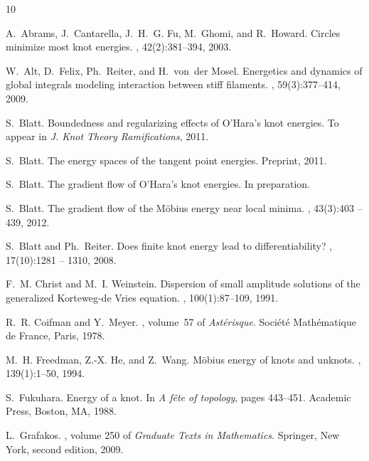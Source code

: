 \documentclass[a4paper,10pt]{article}
\theoremstyle{proof}
\theoremstyle{plain}
\numberwithin{equation}{section}
\begin{document}
\begin{thebibliography}{10}

A.~Abrams, J.~Cantarella, J.~H.~G. Fu, M.~Ghomi, and R.~Howard.
\newblock Circles minimize most knot energies.
, 42(2):381--394, 2003.

W.~Alt, D.~Felix, {\relax Ph}.~Reiter, and H.~von~der Mosel.
\newblock Energetics and dynamics of global integrals modeling interaction
  between stiff filaments.
, 59(3):377--414, 2009.

S.~Blatt.
\newblock Boundedness and regularizing effects of {O'Hara}'s knot energies.
\newblock To appear in {\em J. Knot Theory Ramifications},
  2011.

S.~Blatt.
\newblock The energy spaces of the tangent point energies.
\newblock Preprint, 2011.

S.~Blatt.
\newblock The gradient flow of {O'Hara}'s knot energies.
\newblock In preparation.

S.~Blatt.
\newblock The gradient flow of the {M}\"obius energy near local minima.
, 43(3):403 --439, 2012.

S.~Blatt and {\relax Ph}.~Reiter.
\newblock Does finite knot energy lead to differentiability?
, 17(10):1281 -- 1310, 2008.

F.~M. Christ and M.~I. Weinstein.
\newblock Dispersion of small amplitude solutions of the generalized
  {K}orteweg-de {V}ries equation.
, 100(1):87--109, 1991.

R.~R. Coifman and Y.~Meyer.
, volume~57 of
  {\em Ast\'erisque}.
\newblock Soci\'et\'e Math\'ematique de France, Paris, 1978.

M.~H. Freedman, Z.-X. He, and Z.~Wang.
\newblock M\"obius energy of knots and unknots.
, 139(1):1--50, 1994.

S.~Fukuhara.
\newblock Energy of a knot.
\newblock In {\em A f\^ete of topology}, pages 443--451. Academic Press,
  Boston, MA, 1988.

L.~Grafakos.
, volume 250 of {\em Graduate Texts in
  Mathematics}.
\newblock Springer, New York, second edition, 2009.


\end{thebibliography}
\end{document}
